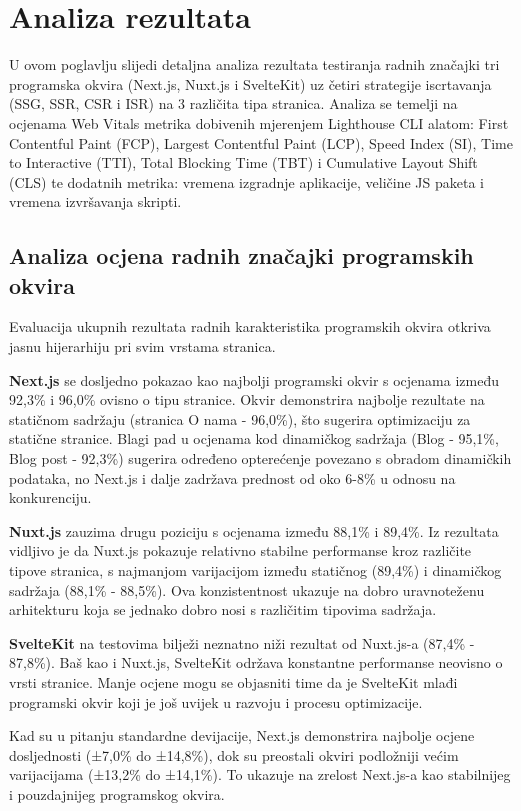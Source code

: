 \section{Analiza rezultata}

U ovom poglavlju slijedi detaljna analiza rezultata testiranja radnih značajki tri programska okvira (Next.js, Nuxt.js i SvelteKit) uz četiri strategije iscrtavanja (SSG, SSR, CSR i ISR) na 3 različita tipa stranica. Analiza se temelji na ocjenama  Web Vitals metrika dobivenih mjerenjem Lighthouse CLI alatom: First Contentful Paint (FCP), Largest Contentful Paint (LCP), Speed Index (SI), Time to Interactive (TTI), Total Blocking Time (TBT) i Cumulative Layout Shift (CLS) te dodatnih metrika: vremena izgradnje aplikacije, veličine JS paketa i vremena izvršavanja skripti.

\subsection{Analiza ocjena radnih značajki programskih okvira}

Evaluacija ukupnih rezultata radnih karakteristika programskih okvira otkriva jasnu hijerarhiju pri svim vrstama stranica.

\textbf{Next.js} se dosljedno pokazao kao najbolji programski okvir s ocjenama između 92,3\% i 96,0\% ovisno o tipu stranice. Okvir demonstrira najbolje rezultate na statičnom sadržaju (stranica O nama - 96,0\%), što sugerira optimizaciju za statične stranice. Blagi pad u ocjenama kod dinamičkog sadržaja (Blog - 95,1\%, Blog post - 92,3\%) sugerira određeno opterećenje povezano s obradom dinamičkih podataka, no Next.js i dalje zadržava prednost od oko 6-8\% u odnosu na konkurenciju.

\textbf{Nuxt.js} zauzima drugu poziciju s ocjenama između 88,1\% i 89,4\%. Iz rezultata vidljivo je da Nuxt.js pokazuje relativno stabilne performanse kroz različite tipove stranica, s najmanjom varijacijom između statičnog (89,4\%) i dinamičkog sadržaja (88,1\% - 88,5\%). Ova konzistentnost ukazuje na dobro uravnoteženu arhitekturu koja se jednako dobro nosi s različitim tipovima sadržaja.

\textbf{SvelteKit} na testovima bilježi neznatno niži rezultat od Nuxt.js-a (87,4\% - 87,8\%). Baš kao i Nuxt.js, SvelteKit održava konstantne performanse neovisno o vrsti stranice. Manje ocjene mogu se objasniti time da je SvelteKit mlađi programski okvir koji je još uvijek u razvoju i procesu optimizacije.

Kad su u pitanju standardne devijacije, Next.js demonstrira najbolje ocjene dosljednosti (±7,0\% do ±14,8\%), dok su preostali okviri podložniji većim varijacijama (±13,2\% do ±14,1\%). To ukazuje na zrelost Next.js-a kao stabilnijeg i pouzdajnijeg programskog okvira.


